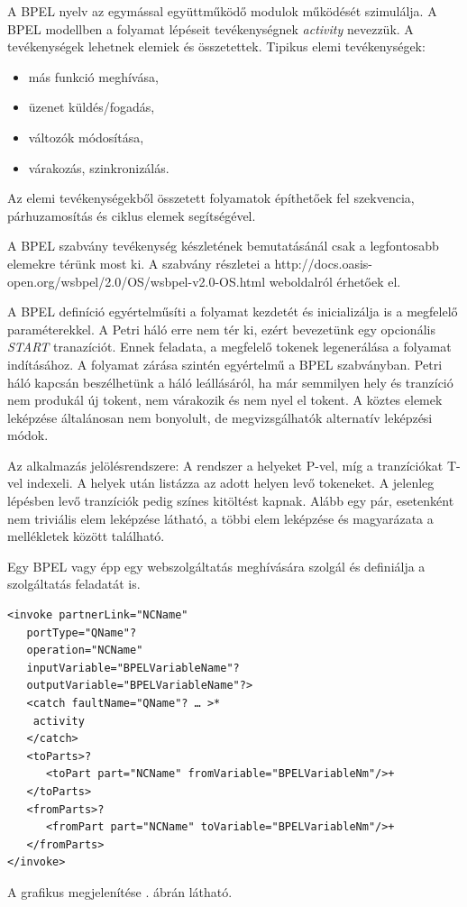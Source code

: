 

A BPEL nyelv az egymással együttműködő modulok működését szimulálja. A BPEL  modellben a folyamat lépéseit tevékenységnek \textsl{activity} nevezzük. A tevékenységek lehetnek elemiek és összetettek. Tipikus elemi tevékenységek:
\begin{itemize}
\item más funkció meghívása,
\item üzenet küldés/fogadás,
\item változók módosítása,
\item várakozás, szinkronizálás.
\end{itemize}
Az elemi tevékenységekből összetett folyamatok építhetőek fel szekvencia, párhuzamosítás és ciklus elemek segítségével.

A BPEL szabvány tevékenység készletének bemutatásánál csak a legfontosabb elemekre térünk most ki. A szabvány részletei a
http://docs.oasis-open.org/wsbpel/2.0/OS/wsbpel-v2.0-OS.html weboldalról érhetőek el. 

A BPEL definíció egyértelműsíti a folyamat kezdetét és inicializálja is a megfelelő paraméterekkel. A Petri háló erre nem tér ki, ezért bevezetünk egy opcionális \textit{START} tranazíciót. Ennek feladata, a megfelelő tokenek legenerálása a folyamat indításához. A folyamat zárása szintén egyértelmű a BPEL szabványban. Petri háló kapcsán beszélhetünk a háló leállásáról, ha már semmilyen hely és tranzíció nem produkál új tokent, nem várakozik és nem nyel el tokent. A köztes elemek leképzése általánosan nem bonyolult, de megvizsgálhatók alternatív leképzési módok. 

Az alkalmazás jelölésrendszere: A rendszer a helyeket P-vel, míg a tranzíciókat T-vel indexeli. A helyek után listázza az adott helyen levő tokeneket. A jelenleg lépésben levő tranzíciók pedig színes kitöltést kapnak. Alább egy pár, esetenként nem triviális elem leképzése látható, a többi elem leképzése és magyarázata a mellékletek között található.

Egy BPEL vagy épp egy webszolgáltatás meghívására szolgál és definiálja a szolgáltatás feladatát is. 
\begin{verbatim}
<invoke partnerLink="NCName"
   portType="QName"?
   operation="NCName"
   inputVariable="BPELVariableName"?
   outputVariable="BPELVariableName"?>
   <catch faultName="QName"? … >*
  	activity
   </catch>
   <toParts>?
      <toPart part="NCName" fromVariable="BPELVariableNm"/>+
   </toParts>
   <fromParts>?
      <fromPart part="NCName" toVariable="BPELVariableNm"/>+
   </fromParts>
</invoke>
\end{verbatim}
A grafikus megjelenítése . ábrán látható.

